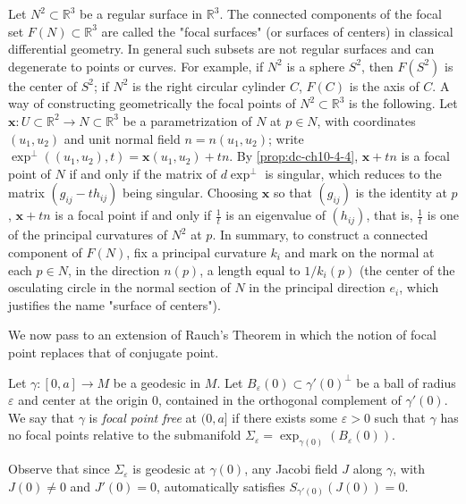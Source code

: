 \begin{example}[Example 4.6]
  \label{ex:dc-ch10-4-6}
  Let $N^2\subset\mathbb{R}^3$ be a regular surface in $\mathbb{R}^3$. The connected
  components of the focal set $F(N)\subset\mathbb{R}^3$ are called the "focal
  surfaces" (or surfaces of centers) in classical differential geometry. In general
  such subsets are not regular surfaces and can degenerate to points or curves. For
  example, if $N^2$ is a sphere $S^2$, then $F(S^2)$ is the center of $S^2$; if
  $N^2$ is the right circular cylinder $C$, $F(C)$ is the axis of $C$. A way of
  constructing geometrically the focal points of $N^2\subset\mathbb{R}^3$ is the
  following. Let $\mathbf{x}:U\subset\mathbb{R}^2\to N\subset\mathbb{R}^3$ be a
  parametrization of $N$ at $p\in N$, with coordinates $(u_1,u_2)$ and unit normal
  field $n=n(u_1,u_2)$; write $\exp^\perp((u_1,u_2),t)=\mathbf{x}(u_1,u_2)+tn$. By
  \cref{prop:dc-ch10-4-4}, $\mathbf{x}+tn$ is a focal point of $N$ if and only if the matrix
  of $d\exp^\perp$ is singular, which reduces to the matrix $(g_{ij}-th_{ij})$ being
  singular. Choosing $\mathbf{x}$ so that $(g_{ij})$ is the identity at $p$,
  $\mathbf{x}+tn$ is a focal point if and only if $\frac{1}{t}$ is an eigenvalue of
  $(h_{ij})$, that is, $\frac{1}{t}$ is one of the principal curvatures of $N^2$ at
  $p$. In summary, to construct a connected component of $F(N)$, fix a principal
  curvature $k_i$ and mark on the normal at each $p\in N$, in the direction $n(p)$,
  a length equal to $1/k_i(p)$ (the center of the osculating circle in the normal
  section of $N$ in the principal direction $e_i$, which justifies the name "surface
  of centers").
  
  We now pass to an extension of Rauch's Theorem in which the notion of focal point
  replaces that of conjugate point.
\end{example}

\begin{definition}
  \label{def:dc-ch10-4-7}
  Let $\gamma:[0,a]\to M$ be a geodesic in $M$. Let $B_\varepsilon(0)\subset\gamma'(0)^\perp$
  be a ball of radius $\varepsilon$ and center at the origin $0$, contained in the
  orthogonal complement of $\gamma'(0)$. We say that $\gamma$ is \emph{focal point free}
  at $(0,a]$ if there exists some $\varepsilon>0$ such that $\gamma$ has no focal
  points relative to the submanifold $\Sigma_\varepsilon=\exp_{\gamma(0)}(B_\varepsilon(0))$.
  
  Observe that since $\Sigma_\varepsilon$ is geodesic at $\gamma(0)$, any Jacobi field $J$
  along $\gamma$, with $J(0)\neq 0$ and $J'(0)=0$, automatically satisfies
  $S_{\gamma'(0)}(J(0))=0$.
\end{definition}

